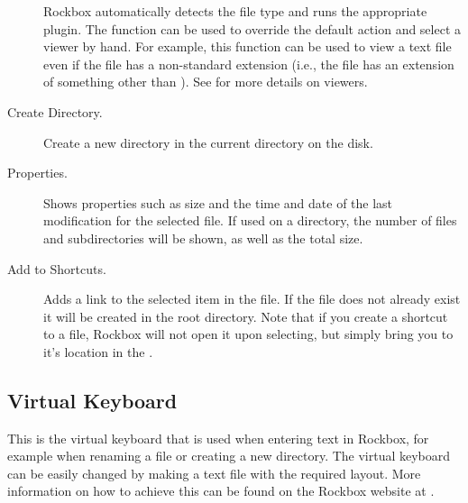 \begin{description}
  Rockbox automatically detects the file type and runs the appropriate plugin.
  The  function can be used to override the default action and
  select a viewer by hand.
  For example, this function can be used to view a text file
  even if the file has a non-standard extension (i.e., the file has an extension
  of something other than ). See 
  for more details on viewers.
\item [Create Directory.]
  Create a new directory in the current directory on the disk.
\item [Properties.]
  Shows properties such as size and the time and date of the last modification
  for the selected file. If used on a directory, the number of files and
  subdirectories will be shown, as well as the total size.
\item [Add to Shortcuts.]
  Adds a link to the selected item in the  file.
  If the file does not already exist it will be created in the root directory.
  Note that if you create a shortcut to a file, Rockbox will not open it upon
  selecting, but simply bring you to it's location in the .
\end{description}

\subsection{\label{sec:virtual_keyboard}Virtual Keyboard}
This is the virtual keyboard that is used when entering text in Rockbox, for 
example when renaming a file or creating a new directory.  The virtual keyboard 
can be easily changed by making a text file with the required layout.  More
 information on how to achieve this can be found on the Rockbox website
 at .

